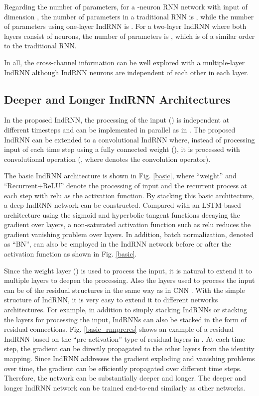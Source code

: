\documentclass[10pt,twocolumn,letterpaper]{article}
\begin{document}
Regarding the number of parameters, for a -neuron RNN network with input of dimension , the number of parameters in a traditional RNN is , while the number of parameters using one-layer IndRNN is . For a two-layer IndRNN where both layers consist of  neurons, the number of parameters is , which is of a similar order to the traditional RNN. 

In all, the cross-channel information can be well explored with a multiple-layer IndRNN although IndRNN neurons are independent of each other in each layer. 

\subsection{Deeper and Longer IndRNN Architectures}
\label{rnn_arcs}
In the proposed IndRNN, the processing of the input () is independent at different timesteps and can be  implemented in parallel as in \cite{bradbury2016quasi,lei2017training}. The proposed IndRNN can be extended to a convolutional IndRNN where, instead of processing input of each time step using a fully connected weight (), it is processed with convolutional operation (, where  denotes the convolution operator).

The basic IndRNN architecture is shown in Fig. \ref{basic}, where ``weight'' and ``Recurrent+ReLU'' denote the processing of input and the recurrent process at each step with relu as the activation function. By stacking this basic architecture, a deep IndRNN network can be constructed. Compared with an LSTM-based architecture using the sigmoid and hyperbolic tangent functions decaying the gradient over layers, a non-saturated activation function such as relu reduces the gradient vanishing problem over layers. In addition, batch normalization, denoted as ``BN'', can also be employed in the IndRNN network before or after the activation function as shown in Fig. \ref{basic}.  

Since the weight layer () is used to process the input, it is natural to extend it to multiple layers to deepen the processing. Also the layers used to process the input can be of the residual structures in the same way as in CNN \cite{he2016deep}. With the simple structure of IndRNN, it is very easy to extend it to different networks architectures. For example, in addition to simply stacking IndRNNs or stacking the layers for processing the input, IndRNNs can also be stacked in the form of residual connections. Fig. \ref{basic_rnnpreres} shows an example of a residual IndRNN based on the ``pre-activation'' type of residual layers in \cite{he2016identity}. At each time step, the gradient can be directly propagated to the other layers from the identity mapping. Since IndRNN addresses the gradient exploding and vanishing problems over time, the gradient can be efficiently propagated over different time steps. Therefore, the network can be substantially deeper and longer. The deeper and longer IndRNN network can be trained end-to-end similarly as other networks.
\end{document}
